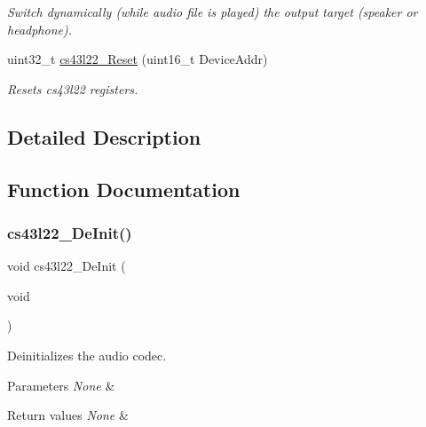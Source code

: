 \begin{DoxyCompactItemize}
\begin{DoxyCompactList}\small\item\em Switch dynamically (while audio file is played) the output target (speaker or headphone). \end{DoxyCompactList}\item 
uint32\+\_\+t \mbox{\hyperlink{group___c_s43_l22___private___functions_ga647488feb466972a5557a2fe2e9350e7}{cs43l22\+\_\+\+Reset}} (uint16\+\_\+t Device\+Addr)
\begin{DoxyCompactList}\small\item\em Resets cs43l22 registers. \end{DoxyCompactList}\end{DoxyCompactItemize}


\subsection{Detailed Description}


\subsection{Function Documentation}
\mbox{\label{group___c_s43_l22___private___functions_gaeba1251bafcbeacb591dfe8cb8175447}} 
\subsubsection{\texorpdfstring{cs43l22\+\_\+\+De\+Init()}{cs43l22\_DeInit()}}
{\footnotesize\ttfamily void cs43l22\+\_\+\+De\+Init (\begin{DoxyParamCaption}\item[{void}]{ }\end{DoxyParamCaption})}



Deinitializes the audio codec. 


\begin{DoxyParams}{Parameters}
{\em None} & \\
\hline
\end{DoxyParams}

\begin{DoxyRetVals}{Return values}
{\em None} & \\
\hline
\end{DoxyRetVals}


